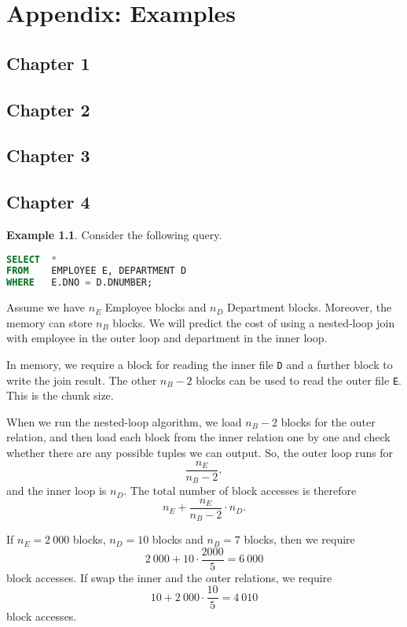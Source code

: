 \documentclass[a4paper, openany]{memoir}
\theoremstyle{definition}
\newtheorem{example}[subsection]{Example}
\begin{document}
\chapter{Appendix: Examples}
\section{Chapter 1}

\newpage

\section{Chapter 2}

\newpage

\section{Chapter 3}

\newpage

\section{Chapter 4}
\begin{example}
    Consider the following query.
\begin{lstlisting}[language=SQL]
SELECT  *
FROM    EMPLOYEE E, DEPARTMENT D
WHERE   E.DNO = D.DNUMBER;
\end{lstlisting}
    Assume we have $n_E$ Employee blocks and $n_D$ Department blocks. Moreover, the memory can store $n_B$ blocks. We will predict the cost of using a nested-loop join with employee in the outer loop and department in the inner loop.    
\end{example}
\begin{answer}
    In memory, we require a block for reading the inner file \texttt{D} and a further block to write the join result. The other $n_B - 2$ blocks can be used to read the outer file \texttt{E}. This is the chunk size.

    When we run the nested-loop algorithm, we load $n_B - 2$ blocks for the outer relation, and then load each block from the inner relation one by one and check whether there are any possible tuples we can output. So, the outer loop runs for
    \[\frac{n_E}{n_B - 2},\]
    and the inner loop is $n_D$. The total number of block accesses is therefore
    \[n_E + \frac{n_E}{n_B - 2} \cdot n_D.\]

    If $n_E = 2 \ 000$ blocks, $n_D = 10$ blocks and $n_B = 7$ blocks, then we require 
    \[2 \ 000 + 10 \cdot \frac{2000}{5} = 6 \ 000\]
    block accesses. If swap the inner and the outer relations, we require
    \[10 + 2 \ 000 \cdot \frac{10}{5} = 4 \ 010\]
    block accesses.
\end{answer}
\newpage
\end{document}
